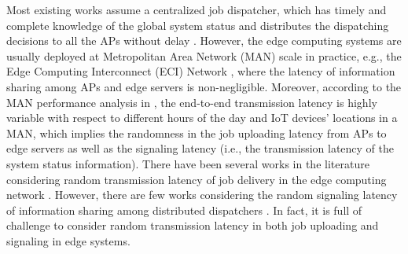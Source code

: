 Most existing works assume a centralized job dispatcher, which has timely and complete knowledge of the global system status and distributes the dispatching decisions to all the APs without delay \cite{tan-online,IOTJ18-FanQ,mdp-globecom,mdp-tvt,MASS18-MengZ}.
However, the edge computing systems are usually deployed at Metropolitan Area Network (MAN) scale in practice, e.g., the Edge Computing Interconnect (ECI) Network \cite{MAN-ECI}, where the latency of information sharing among APs and edge servers is non-negligible. Moreover, according to the MAN performance analysis in \cite{MAN-LATENCY}, the end-to-end transmission latency is highly variable with respect to different hours of the day and IoT devices' locations in a MAN, which implies the randomness in the job uploading latency from APs to edge servers as well as the signaling latency (i.e., the transmission latency of the {system status} information).
There have been several works in the literature considering random transmission latency of job delivery in the edge computing network \cite{latency-EDGE19,MOBIHOC19-ZhouZ,IOTJ18-FanQ,TOC19-LiuC,JSAC19-AlameddineHA}.
However, there are few works considering the random signaling latency of information sharing among distributed dispatchers \cite{tan-online,TWC18-LyuX}.
In fact, it is full of challenge to consider random transmission latency in both job uploading and signaling in edge systems.

